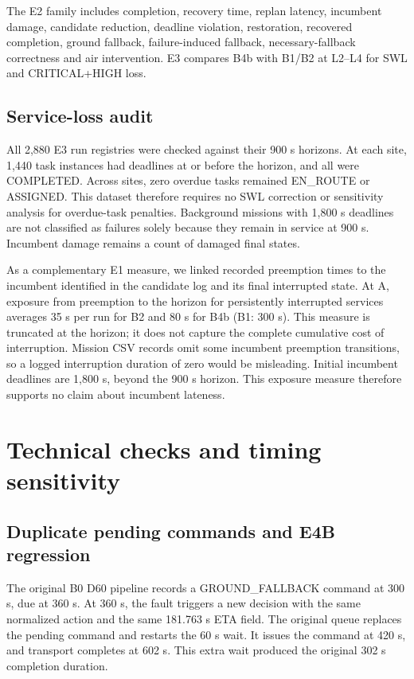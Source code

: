 \documentclass[11pt,a4paper]{article}
\begin{document}
The E2 family includes completion, recovery time, replan latency, incumbent damage, candidate reduction, deadline violation, restoration, recovered completion, ground fallback, failure-induced fallback, necessary-fallback correctness and air intervention. E3 compares B4b with B1/B2 at L2--L4 for SWL and CRITICAL+HIGH loss.



\subsection{Service-loss audit}

All 2,880 E3 run registries were checked against their 900 s horizons. At each site, 1,440 task instances had deadlines at or before the horizon, and all were COMPLETED. Across sites, zero overdue tasks remained EN\_ROUTE or ASSIGNED. This dataset therefore requires no SWL correction or sensitivity analysis for overdue-task penalties. Background missions with 1,800 s deadlines are not classified as failures solely because they remain in service at 900 s. Incumbent damage remains a count of damaged final states.

As a complementary E1 measure, we linked recorded preemption times to the incumbent identified in the candidate log and its final interrupted state. At A, exposure from preemption to the horizon for persistently interrupted services averages 35 s per run for B2 and 80 s for B4b (B1: 300 s). This measure is truncated at the horizon; it does not capture the complete cumulative cost of interruption. Mission CSV records omit some incumbent preemption transitions, so a logged interruption duration of zero would be misleading. Initial incumbent deadlines are 1,800 s, beyond the 900 s horizon. This exposure measure therefore supports no claim about incumbent lateness.

\section{Technical checks and timing sensitivity}

\subsection{Duplicate pending commands and E4B regression}

The original B0 D60 pipeline records a GROUND\_FALLBACK command at 300 s, due at 360 s. At 360 s, the fault triggers a new decision with the same normalized action and the same 181.763 s ETA field. The original queue replaces the pending command and restarts the 60 s wait. It issues the command at 420 s, and transport completes at 602 s. This extra wait produced the original 302 s completion duration.
\end{document}
